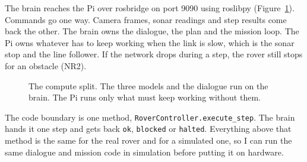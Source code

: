 The brain reaches the Pi over rosbridge on port 9090 using roslibpy
(Figure~\ref{fig:split}). Commands go one way. Camera frames, sonar readings and
step results come back the other. The brain owns the dialogue, the plan and the
mission loop. The Pi owns whatever has to keep working when the link is slow,
which is the sonar stop and the line follower. If the network drops during a
step, the rover still stops for an obstacle (NR2).

\begin{figure}[htbp]
  \centering
  \caption{The compute split. The three models and the dialogue run on the brain. The Pi runs only what must keep working without them.}
  \label{fig:split}
\end{figure}

The code boundary is one method, \texttt{RoverController.execute\_step}. The brain
hands it one step and gets back \texttt{ok}, \texttt{blocked} or \texttt{halted}.
Everything above that method is the same for the real rover and for a simulated
one, so I can run the same dialogue and mission code in simulation before
putting it on hardware.

